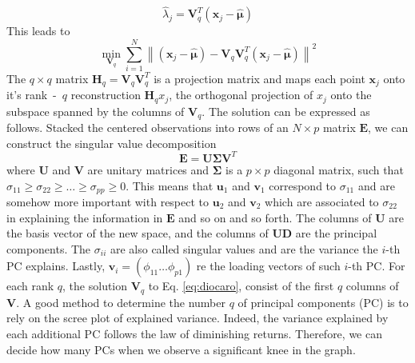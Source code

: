 \begin{equation}
    \hat{\lambda}_j = \mathbf{V}_q^{T}(\mathbf{x}_j-\hat{\bm{\mu}})
\end{equation}
This leads to 
\begin{equation}
\label{eq:diocaro}
    \min _{\mathbf{V}_q} \sum_{i=1}^N\left\|\left(\mathbf{x}_j-\hat{\bm{\mu}}\right)-\mathbf{V}_q \mathbf{V}_q^T\left(\mathbf{x}_j-\hat{\bm{\mu}}\right)\right\|^2
\end{equation}
The $q \times q$ matrix $\mathbf{H}_q=\mathbf{V}_q\mathbf{V}_q^T$ is a projection matrix and maps each point $\mathbf{x}_j$ onto it's rank~-~$q$ reconstruction $\mathbf{H}_qx_j$, the orthogonal projection of $x_j$ onto the subspace spanned by the columns of $\mathbf{V}_q$. The solution can be expressed as follows. Stacked the centered observations into rows of an $N\times p$ matrix $\mathbf{E}$, we can construct the singular value decomposition
\begin{equation}
    \label{eq:SVD}
    \mathbf{E}=\mathbf{U}\bm{\Sigma}\mathbf{V}^T
\end{equation}
where $\mathbf{U}$ and $\mathbf{V}$ are unitary matrices and $\bm{\Sigma}$ is a $p \times p$ diagonal matrix, such that $\sigma_{11}\ge \sigma_{22} \ge \dots \ge \sigma_{pp}\ge 0$. This means that $\mathbf{u}_1$ and $\mathbf{v}_1$ correspond to $\sigma_{11}$ and are somehow more important with respect to $\mathbf{u}_2$ and $\mathbf{v}_2$ which are associated to $\sigma_{22}$ in explaining the information in $\mathbf{E}$ and so on and so forth. The columns of $\mathbf{U}$ are the basis vector of the new space, and the columns of $\mathbf{U}\mathbf{D}$ are the principal components. The $\sigma_{ii}$ are also called singular values and are the variance the $i$-th PC explains. Lastly, $\mathbf{v}_i=(\phi_{11} \dots \phi_{p1})$ re the loading vectors of such $i$-th PC.  For each rank $q$, the solution $\mathbf{V}_q$ to Eq. \ref{eq:diocaro}, consist of the first $q$ columns of $\mathbf{V}$. A good method to determine the number $q$ of principal components (PC) is to rely on the scree plot of explained variance. Indeed, the variance explained by each additional PC follows the law of diminishing returns. Therefore, we can decide how many PCs when we observe a significant knee in the graph.

